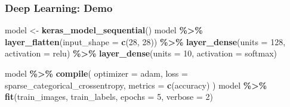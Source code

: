 \documentclass[
  shownotes,
  xcolor={svgnames},
  hyperref={colorlinks,citecolor=DarkBlue,linkcolor=DarkRed,urlcolor=DarkBlue}
  , aspectratio=169]{beamer}
\newenvironment{Shaded}{\begin{snugshade}}{\end{snugshade}}
\newcommand{\DataTypeTok}[1]{\textcolor[rgb]{0.13,0.29,0.53}{#1}}
\newcommand{\DecValTok}[1]{\textcolor[rgb]{0.00,0.00,0.81}{#1}}
\newcommand{\KeywordTok}[1]{\textcolor[rgb]{0.13,0.29,0.53}{\textbf{#1}}}
\newcommand{\NormalTok}[1]{#1}
\newcommand{\OperatorTok}[1]{\textcolor[rgb]{0.81,0.36,0.00}{\textbf{#1}}}
\newcommand{\StringTok}[1]{\textcolor[rgb]{0.31,0.60,0.02}{#1}}
\begin{document}
\begin{frame}[fragile]
\frametitle{Deep Learning: Demo}


\begin{Shaded}
\begin{Highlighting}[]
\NormalTok{model \textless{}{-}}\StringTok{ }\KeywordTok{keras\_model\_sequential}\NormalTok{()}
\NormalTok{model }\OperatorTok{\%\textgreater{}\%}
\StringTok{  }\KeywordTok{layer\_flatten}\NormalTok{(}\DataTypeTok{input\_shape =} \KeywordTok{c}\NormalTok{(}\DecValTok{28}\NormalTok{, }\DecValTok{28}\NormalTok{)) }\OperatorTok{\%\textgreater{}\%}
\StringTok{  }\KeywordTok{layer\_dense}\NormalTok{(}\DataTypeTok{units =} \DecValTok{128}\NormalTok{, }\DataTypeTok{activation =} \StringTok{\textquotesingle{}relu\textquotesingle{}}\NormalTok{) }\OperatorTok{\%\textgreater{}\%}
\StringTok{  }\KeywordTok{layer\_dense}\NormalTok{(}\DataTypeTok{units =} \DecValTok{10}\NormalTok{, }\DataTypeTok{activation =} \StringTok{\textquotesingle{}softmax\textquotesingle{}}\NormalTok{)}
\end{Highlighting}
\end{Shaded}

\begin{Shaded}
\begin{Highlighting}[]
\NormalTok{model }\OperatorTok{\%\textgreater{}\%}\StringTok{ }\KeywordTok{compile}\NormalTok{(}
  \DataTypeTok{optimizer =} \StringTok{\textquotesingle{}adam\textquotesingle{}}\NormalTok{, }
  \DataTypeTok{loss =} \StringTok{\textquotesingle{}sparse\_categorical\_crossentropy\textquotesingle{}}\NormalTok{,}
  \DataTypeTok{metrics =} \KeywordTok{c}\NormalTok{(}\StringTok{\textquotesingle{}accuracy\textquotesingle{}}\NormalTok{)}
\NormalTok{)}
\NormalTok{model }\OperatorTok{\%\textgreater{}\%}\StringTok{ }\KeywordTok{fit}\NormalTok{(train\_images, train\_labels, }\DataTypeTok{epochs =} \DecValTok{5}\NormalTok{, }\DataTypeTok{verbose =} \DecValTok{2}\NormalTok{)}
\end{Highlighting}
\end{Shaded}

\end{frame}
\end{document}
